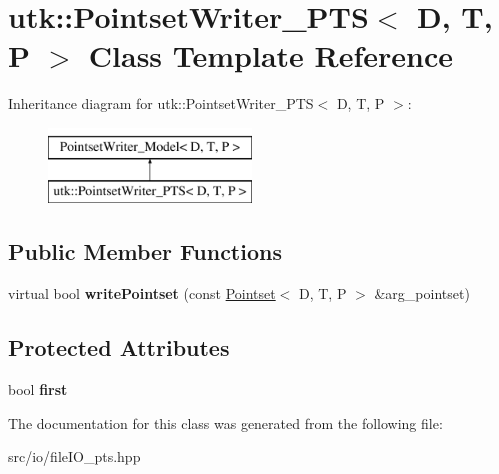 \hypertarget{classutk_1_1PointsetWriter__PTS}{\section{utk\-:\-:Pointset\-Writer\-\_\-\-P\-T\-S$<$ D, T, P $>$ Class Template Reference}
\label{classutk_1_1PointsetWriter__PTS}
}
Inheritance diagram for utk\-:\-:Pointset\-Writer\-\_\-\-P\-T\-S$<$ D, T, P $>$\-:\begin{figure}[H]
\begin{center}
\leavevmode
\includegraphics[height=2.000000cm]{classutk_1_1PointsetWriter__PTS}
\end{center}
\end{figure}
\subsection*{Public Member Functions}
\begin{DoxyCompactItemize}
\item 
\hypertarget{classutk_1_1PointsetWriter__PTS_a084e9699d693e6bd0b34bb6df9af9701}{virtual bool {\bfseries write\-Pointset} (const \hyperlink{classutk_1_1Pointset}{Pointset}$<$ D, T, P $>$ \&arg\-\_\-pointset)}\label{classutk_1_1PointsetWriter__PTS_a084e9699d693e6bd0b34bb6df9af9701}

\end{DoxyCompactItemize}
\subsection*{Protected Attributes}
\begin{DoxyCompactItemize}
\item 
\hypertarget{classutk_1_1PointsetWriter__PTS_a269160bb4a7ae17f8a2ddd4f1ccd73a9}{bool {\bfseries first}}\label{classutk_1_1PointsetWriter__PTS_a269160bb4a7ae17f8a2ddd4f1ccd73a9}

\end{DoxyCompactItemize}


The documentation for this class was generated from the following file\-:\begin{DoxyCompactItemize}
\item 
src/io/file\-I\-O\-\_\-pts.\-hpp\end{DoxyCompactItemize}
